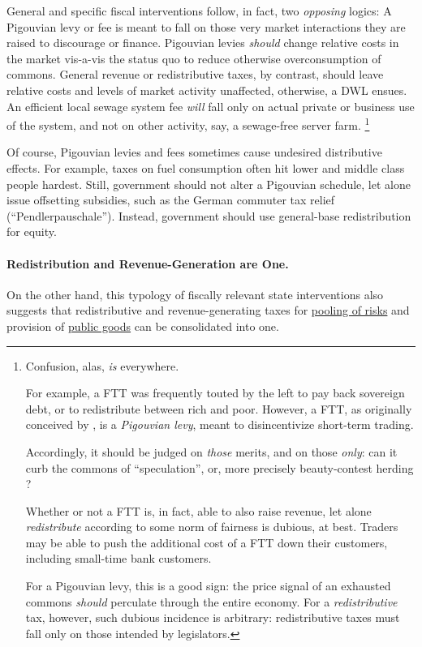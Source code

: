 General and specific fiscal interventions follow, in fact, two \emph{opposing} logics:
A Pigouvian levy or fee is meant to fall on those very market interactions they are raised to discourage or finance.
Pigouvian levies \emph{should} change relative costs in the market vis-a-vis the status quo to reduce otherwise overconsumption of commons.
General revenue or redistributive taxes, by contrast, should leave relative costs and levels of market activity unaffected, otherwise, a \gls{DWL} ensues.
An efficient local sewage system fee \emph{will} fall only on actual private or business use of the system, and not on other activity, say, a sewage-free server farm.
\footnote{
	Confusion, alas, \emph{is} everywhere.

	For example, a \gls{FTT} was frequently touted by the left to pay back sovereign debt, or to redistribute between rich and poor.
	However, a \gls{FTT}, as originally conceived by \cite{Tobin1970}, is a \emph{Pigouvian levy}, meant to disincentivize short-term trading.

	Accordingly, it should be judged on \emph{those} merits, and on those \emph{only}:
	can it curb the commons of ``speculation'', or, more precisely beauty-contest \citep{Keynes1936} herding \citep{Banerjee-1992-aa}?

	Whether or not a \gls{FTT} is, in fact, able to also raise revenue, let alone \emph{redistribute} according to some norm of fairness is dubious, at best.
	Traders may be able to push the additional cost of a \gls{FTT} down their customers, including small-time bank customers.

	For a Pigouvian levy, this is a good sign:
	the price signal of an exhausted commons \emph{should} perculate through the entire economy.
	For a \emph{redistributive} tax, however, such dubious incidence is arbitrary:
	redistributive taxes must fall only on those intended by legislators.
}

Of course, Pigouvian levies and fees sometimes cause undesired distributive effects.
For example, taxes on fuel consumption often hit lower and middle class people hardest.
Still, government should not alter a Pigouvian schedule, let alone issue offsetting subsidies, such as the German commuter tax relief (``Pendlerpauschale'').
Instead, government should use general-base redistribution for equity.

\paragraph{Redistribution and Revenue-Generation are One.} \label{sec:RedistributionAndRevenueAreOne} On the other hand, this typology of fiscally relevant state interventions also suggests that redistributive and revenue-generating taxes for \hyperref[sec:RiskPooling]{pooling of risks} and provision of \hyperref[sec:PublicGoods]{public goods} can be consolidated into one.

